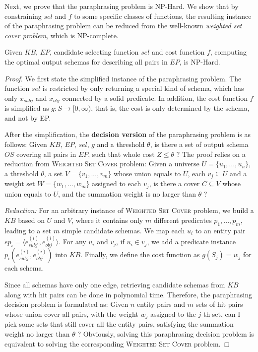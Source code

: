 
Next, we prove that the paraphrasing problem is NP-Hard.
We show that by constraining $sel$ and $f$ to some specific classes of
functions, the resulting instance of the paraphrasing problem can
be reduced from the well-known {\em weighted set cover problem},
which is NP-complete.

\begin{theorem}
Given $KB$, $EP$, candidate selecting function $sel$ and cost function $f$,
computing the optimal output schemas for describing all pairs in $EP$, is NP-Hard.
\end{theorem}

\begin{proof}
We first state the simplified instance of the paraphrasing problem.
The function $sel$ is restricted by only returning a special kind
of schema, which has only $x_{subj}$ and $x_{obj}$ connected by a solid
predicate. In addition, the cost function $f$ is simplified as
$g: S \rightarrow [0, \infty)$, that is,
the cost is only determined by the schema, and not by EP.

After the simplification, the \textbf{decision version} of the
paraphrasing problem is as follows:
Given $KB$, $EP$, $sel$, $g$ and a threshold $\theta$, is there a set of output schema $OS$
covering all pairs in $EP$, such that whole cost $Z \leq \theta$ ?
The proof relies on a reduction from \textsc{Weighted Set Cover} problem:
Given a universe $U = \{u_1, ..., u_n\}$, a threshold $\theta$, a set $V = \{v_1, ..., v_m\}$
whose union equals to $U$, each $v_j \subseteq U$ and a weight set $W = \{w_1, ..., w_m\}$ assigned to each $v_j$,
is there a cover $C \subseteq V$ whose union equals to $U$, and the summation weight is no larger than $\theta$ ?

\textit{Reduction:} For an arbitrary instance of \textsc{Weighted Set Cover} problem,
we build a $KB$ based on $U$ and $V$, where it contains only $m$ different predicates $p_1, ..., p_m$,
leading to a set $m$ simple candidate schemas.
We map each $u_i$ to an entity pair $ep_i = \langle e_{subj}^{(i)}, e_{obj}^{(i)} \rangle $.
For any $u_i$ and $v_j$, if $u_i \in v_j$, we add a predicate instance $p_i(e_{subj}^{(i)}, e_{obj}^{(i)})$ into $KB$.
Finally, we define the cost function as $g(S_j) = w_j$ for each schema.

Since all schemas have only one edge, retrieving candidate schemas from $KB$
along with hit pairs can be done in polynomial time. Therefore, the paraphrasing decision problem
is formulated as: Given $n$ entity pairs and $m$ sets of hit pairs whose union cover all pairs,
with the weight $w_j$ assigned to the $j$-th set, can I pick some sets that still cover all
the entity pairs, satisfying the summation weight no larger than $\theta$ ?
Obviously, solving this paraphrasing decision problem is equivalent to
solving the corresponding \textsc{Weighted Set Cover} problem.
\end{proof}


